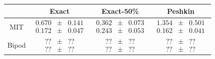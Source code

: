 \documentclass[conference]{IEEEtran}
\begin{document}
\begin{table}[t]
  \begin{center}
      \begin{tabular}[c]{cccc}
        \toprule
        & Exact & Exact-50\% & Peshkin \\
        \midrule
        MIT & $\begin{matrix}0.670\\0.172\end{matrix} \begin{matrix}\pm\\\pm\end{matrix} \begin{matrix}0.141\\ 0.047\end{matrix}$ & $\begin{matrix}\mathbf{0.362}\\\mathbf{0.243}\end{matrix} \begin{matrix}\pm\\\pm\end{matrix} \begin{matrix}0.073\\ 0.053\end{matrix}$ & $\begin{matrix}1.354\\0.162\end{matrix} \begin{matrix}\pm\\\pm\end{matrix} \begin{matrix}0.501\\ 0.041\end{matrix}$ \\
        \midrule
        Bipod & $\begin{matrix}??\\??\end{matrix} \begin{matrix}\pm\\\pm\end{matrix} \begin{matrix}??\\ ??\end{matrix}$ & $\begin{matrix}??\\??\end{matrix} \begin{matrix}\pm\\\pm\end{matrix} \begin{matrix}??\\ ??\end{matrix}$ & $\begin{matrix}??\\??\end{matrix} \begin{matrix}\pm\\\pm\end{matrix} \begin{matrix}??\\??\end{matrix}$ \\

\end{tabular}
\end{center}
\end{table}
\end{document}
